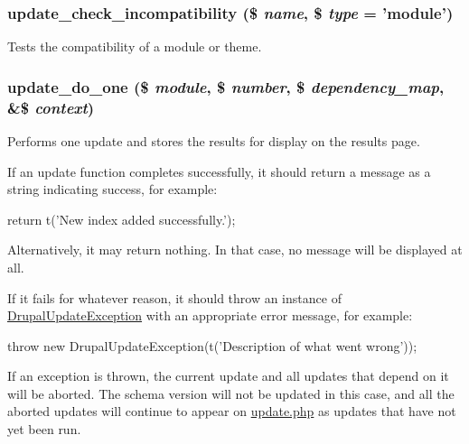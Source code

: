 \hypertarget{update_8inc_a39592132a77fd791c44a8d6faf362cb0}{
\subsubsection[{update\_\-check\_\-incompatibility}]{\setlength{\rightskip}{0pt plus 5cm}update\_\-check\_\-incompatibility (\$ {\em name}, \/  \$ {\em type} = {\ttfamily 'module'})}}
\label{update_8inc_a39592132a77fd791c44a8d6faf362cb0}
Tests the compatibility of a module or theme. \hypertarget{update_8inc_ac46854f64e50a81361ed8816b8f0ce7e}{
\subsubsection[{update\_\-do\_\-one}]{\setlength{\rightskip}{0pt plus 5cm}update\_\-do\_\-one (\$ {\em module}, \/  \$ {\em number}, \/  \$ {\em dependency\_\-map}, \/  \&\$ {\em context})}}
\label{update_8inc_ac46854f64e50a81361ed8816b8f0ce7e}
Performs one update and stores the results for display on the results page.

If an update function completes successfully, it should return a message as a string indicating success, for example: 
\begin{DoxyCode}
 return t('New index added successfully.');
\end{DoxyCode}


Alternatively, it may return nothing. In that case, no message will be displayed at all.

If it fails for whatever reason, it should throw an instance of \hyperlink{classDrupalUpdateException}{DrupalUpdateException} with an appropriate error message, for example: 
\begin{DoxyCode}
 throw new DrupalUpdateException(t('Description of what went wrong'));
\end{DoxyCode}


If an exception is thrown, the current update and all updates that depend on it will be aborted. The schema version will not be updated in this case, and all the aborted updates will continue to appear on \hyperlink{update_8php}{update.php} as updates that have not yet been run.

